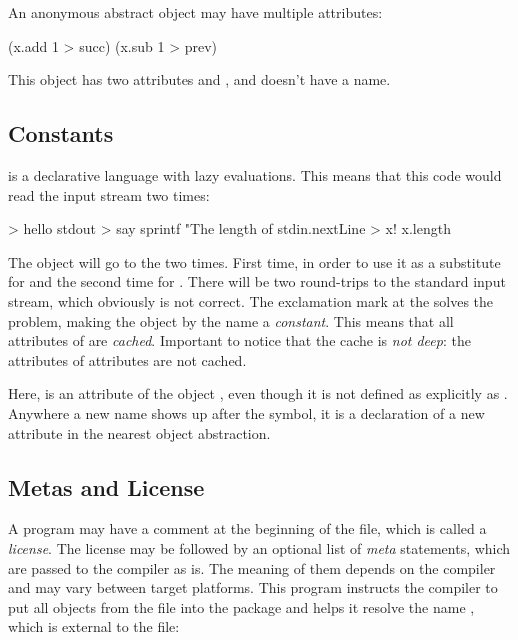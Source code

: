 An anonymous abstract object may have multiple attributes:

\begin{ffcode}
[x] (x.add 1 > succ) (x.sub 1 > prev)
\end{ffcode}

This object has two attributes  and , and doesn't
have a name.

\subsection{Constants}

\eo{} is a declarative language with lazy evaluations. This means
that this code would read the input stream two times:

\begin{ffcode}
[] > hello
  stdout > say
    sprintf
      "The length of %
      stdin.nextLine > x!
      x.length
\end{ffcode}

The  object will go to the  two times. First time,
in order to use it as a substitute for  and the second time for
. There will be two round-trips to the standard input stream, which
obviously is not correct. The exclamation mark at the  solves the
problem, making the object by the name  a \emph{constant}. This means
that all attributes of  are \emph{cached}. Important to notice
that the cache is \emph{not deep}: the attributes of attributes are not cached.

Here,  is an attribute of the object , even though
it is not defined as explicitly as . Anywhere a new
name shows up after the \ff{>} symbol, it is a declaration of a new
attribute in the nearest object abstraction.

\subsection{Metas and License}

A program may have a comment at the beginning of the file, which
is called a \emph{license}. The license may be followed by an optional
list of \emph{meta} statements, which are passed to the compiler
as is. The meaning of them depends on the compiler and may vary
between target platforms. This program instructs the compiler
to put all objects from the file into the package 
and helps it resolve the name , which is external
to the file:

